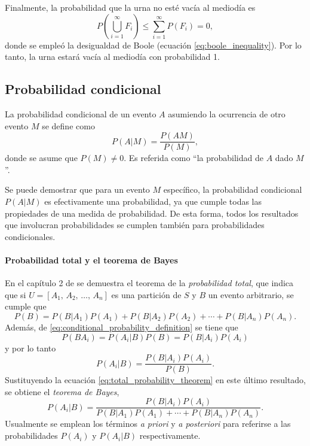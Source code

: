 \documentclass[a4paper]{report}
\begin{document}
Finalmente, la probabilidad que la urna no esté vacía al mediodía es
\[
 P\left(\bigcup_{i=1}^{\infty}F_i\right)\leq\sum_{i=1}^{\infty}P(F_i)=0,
\]
donde se empleó la desigualdad de Boole (ecuación \ref{eq:boole_inequality}). Por lo tanto, la urna estará vacía al mediodía con probabilidad 1.

\subsection{Probabilidad condicional}\label{sec:conditional_probability_events}

La probabilidad condicional de un evento \(A\) asumiendo la ocurrencia de otro evento \(M\) se define como
\begin{equation}\label{eq:conditional_probability_definition}
 P(A|M)={\frac{P(AM)}{P(M)}},
\end{equation}
donde se asume que \(P(M)\neq 0\). Es referida como ``la probabilidad de \(A\) dado \(M\)''.

Se puede demostrar que para un evento \(M\) específico, la probabilidad condicional \(P(A|M)\) es efectivamente una probabilidad, ya que cumple todas las propiedades de una medida de probabilidad. De esta forma, todos los resultados que involucran probabilidades se cumplen también para probabilidades condicionales.

\paragraph{Probabilidad total y el teorema de Bayes}

En el capítulo 2 de \cite{papoulis2002probability} se demuestra el teorema de la \emph{probabilidad total}, que indica que si \(U=[A_1,\,A_2,\,\dots,\,A_n]\) es una partición de \(S\) y \(B\) un evento arbitrario, se cumple que
\begin{equation}\label{eq:total_probability_theorem}
 P(B)=P(B|A_1)P(A_1)+P(B|A_2)P(A_2)+\cdots+P(B|A_n)P(A_n).
\end{equation}
Además, de \ref{eq:conditional_probability_definition} se tiene que
\[
  P(BA_i)=P(A_i|B)P(B)=P(B|A_i)P(A_i)
\]
y por lo tanto
\begin{equation}\label{eq:bayes_theorem_for_events_2}
 P(A_i|B)=\frac{P(B|A_i)P(A_i)}{P(B)}.
\end{equation}
Sustituyendo la ecuación \ref{eq:total_probability_theorem} en este último resultado, se obtiene el \emph{teorema de Bayes},
\begin{equation}\label{eq:bayes_theorem_for_events}
 P(A_i|B)=\frac{P(B|A_i)P(A_i)}{P(B|A_1)P(A_1)+\cdots+P(B|A_n)P(A_n)}.
\end{equation}
Usualmente se emplean los términos \emph{a priori} y \emph{a posteriori} para referirse a las probabilidades \(P(A_i)\) y \(P(A_i|B)\) respectivamente.
\end{document}
